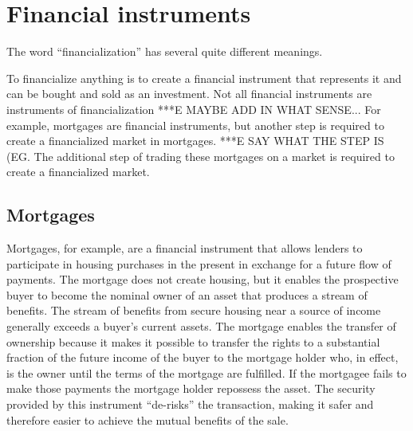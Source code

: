 

\section{Financial instruments} \label{section-financialize}
The word ``financialization'' has several quite different meanings.  


To financialize anything is to create a  \gls{financial instrument} that represents it and can be bought and sold as an investment. Not all financial instruments are instruments of financialization ***E MAYBE ADD IN WHAT SENSE... %
For example, mortgages are  financial instruments, but another step is required to create a financialized  market in mortgages. ***E SAY WHAT THE STEP IS (EG. The additional step of trading these mortgages on a market is required to create a financialized market. 


\subsection{Mortgages}
Mortgages, for example, are a financial instrument that allows lenders to  participate in housing purchases in the present in exchange for a future flow of payments.  The mortgage does not create housing, but it enables the prospective buyer to become the nominal owner of an asset that produces a stream of benefits. The stream of benefits from secure housing near a source of income generally exceeds a buyer's current assets. The mortgage enables the  transfer of ownership because it makes it possible to transfer the rights to a substantial fraction of the future income of the buyer to the mortgage holder who, in effect, is the owner until the terms of the mortgage are fulfilled.  If the mortgagee fails to make those payments the mortgage holder repossess the asset. The security provided by this instrument ``de-risks'' the transaction, making it safer and therefore easier to achieve the mutual benefits of the sale.

